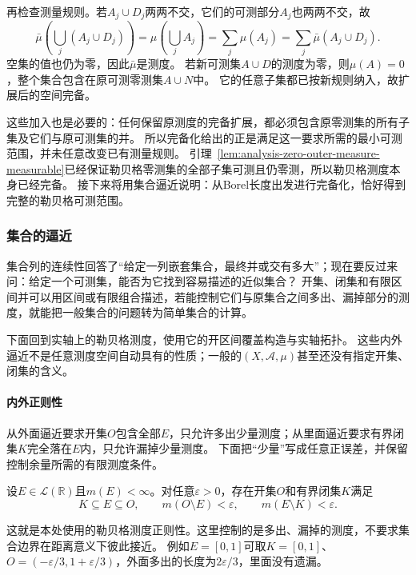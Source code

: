再检查测量规则。若$A_j\cup D_j$两两不交，它们的可测部分$A_j$也两两不交，故
\[
 \bar\mu\left(\bigcup_j(A_j\cup D_j)\right)
 =\mu\left(\bigcup_jA_j\right)
 =\sum_j\mu(A_j)=\sum_j\bar\mu(A_j\cup D_j).
\]
空集的值也仍为零，因此$\bar\mu$是测度。
若新可测集$A\cup D$的测度为零，则$\mu(A)=0$，整个集合包含在原可测零测集$A\cup N$中。
它的任意子集都已按新规则纳入，故扩展后的空间完备。

这些加入也是必要的：任何保留原测度的完备扩展，都必须包含原零测集的所有子集及它们与原可测集的并。
所以完备化给出的正是满足这一要求所需的最小可测范围，并未任意改变已有测量规则。
引理~\ref{lem:analysis-zero-outer-measure-measurable}已经保证勒贝格零测集的全部子集可测且仍零测，所以勒贝格测度本身已经完备。
接下来将用集合逼近说明：从Borel长度出发进行完备化，恰好得到完整的勒贝格可测范围。

\subsubsection{集合的逼近}

集合列的连续性回答了“给定一列嵌套集合，最终并或交有多大”；现在要反过来问：给定一个可测集，能否为它找到容易描述的近似集合？
开集、闭集和有限区间并可以用区间或有限组合描述，若能控制它们与原集合之间多出、漏掉部分的测度，就能把一般集合的问题转为简单集合的计算。

下面回到实轴上的勒贝格测度，使用它的开区间覆盖构造与实轴拓扑。
这些内外逼近不是任意测度空间自动具有的性质；一般的$(X,\mathcal A,\mu)$甚至还没有指定开集、闭集的含义。

\paragraph{内外正则性}

从外面逼近要求开集$O$包含全部$E$，只允许多出少量测度；从里面逼近要求有界闭集$K$完全落在$E$内，只允许漏掉少量测度。
下面把“少量”写成任意正误差，并保留控制余量所需的有限测度条件。
\begin{theorem}[有限测度集合的内外逼近]
设$E\in\mathcal L(\mathbb R)$且$m(E)<\infty$。对任意$\varepsilon>0$，存在开集$O$和有界闭集$K$满足
\begin{equation}
 K\subseteq E\subseteq O,\qquad
 m(O\setminus E)<\varepsilon,\qquad m(E\setminus K)<\varepsilon.
 \label{eq:comb-lebesgue-set-approximation}
\end{equation}
\end{theorem}
这就是本处使用的勒贝格测度正则性。这里控制的是多出、漏掉的测度，不要求集合边界在距离意义下彼此接近。
例如$E=[0,1]$可取$K=[0,1]$、$O=(-\varepsilon/3,1+\varepsilon/3)$，外面多出的长度为$2\varepsilon/3$，里面没有遗漏。

